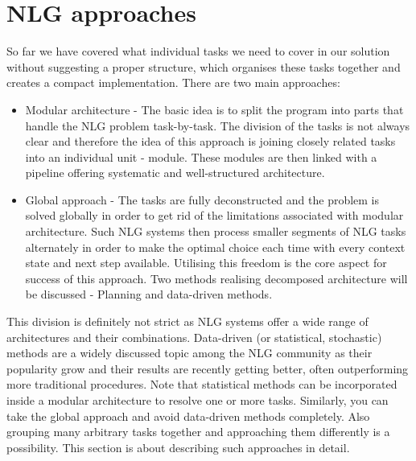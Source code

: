 \chapter{NLG approaches}\label{chap:approaches}
So far we have covered what individual tasks we need to cover in our solution without suggesting a proper structure, which organises these tasks together and creates a compact implementation. There are two main approaches:
\begin{itemize}
	\item Modular architecture - The basic idea is to split the program into parts that handle the NLG problem task-by-task. The division of the tasks is not always clear and therefore the idea of this approach is joining closely related tasks into an individual unit - module. These modules are then linked with a pipeline offering systematic and well-structured architecture.
	\item Global approach - The tasks are fully deconstructed and the problem is solved globally in order to get rid of the limitations associated with modular architecture. Such NLG systems then process smaller segments of NLG tasks alternately in order to make the optimal choice each time with every context state and next step available. Utilising this freedom is the core aspect for success of this approach. Two methods realising decomposed architecture will be discussed - Planning and data-driven methods.
\end{itemize}

This division is definitely not strict as NLG systems offer a wide range of architectures and their combinations. Data-driven (or statistical,  stochastic) methods are a widely discussed topic among the NLG community as their popularity grow and their results are recently getting better, often outperforming more traditional procedures. Note that statistical methods can be incorporated inside a modular architecture to resolve one or more tasks. Similarly, you can take the global approach and avoid data-driven methods completely. Also grouping many arbitrary tasks together and approaching them differently is a possibility. This section is about describing such approaches in detail.

